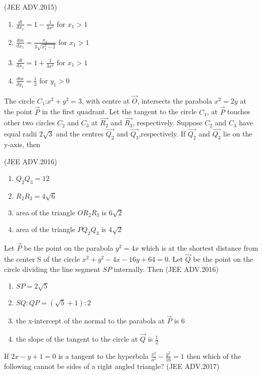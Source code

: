 	      \hfill(JEE ADV.2015)
	      
	       \begin{enumerate}
		      \item $\frac{dl}{dx_1}=1-\frac{1}{3x^2}$ for $x_1>1$ 
		      \item $\frac{dm}{dx_1}=\frac{x_1}{3\sqrt{x_1^2-1}}$ for $x_1>1$ 
		      \item $\frac{dl}{dx_1}=1+\frac{1}{3x^2}$ for $x_1>1$
		      \item $\frac{dm}{dy_1}=\frac{1}{3}$ for $y_1>0$ 
	       \end{enumerate}
      \item The circle $C_1$:$x^2+y^2=3$, with centre at $\vec{O}$, intersects the parabola $x^2=2y$ at the point $\vec{P}$ in the first quadrant. Let the tangent to the circle $C_1$, at $\vec{P}$ touches other two circles $C_2$ and $C_3$ at $\vec{R_2}$ and $\vec{R_3}$, respectively. Suppose $C_2$ and $C_3$ have equal radii $2\sqrt{3}$ and the centres $\vec{Q_2}$ and $\vec{Q_3}$,respectively. If $\vec{Q_2}$ and $\vec{Q_3}$ lie on the y-axis, then 

	      \hfill(JEE ADV.2016)
	      
	       \begin{enumerate}
		      \item $Q_2Q_3=12$
		      \item $R_2R_3=4\sqrt{6}$
		      \item area of the triangle $OR_2R_3$ is $6\sqrt{2}$
		      \item area of the triangle $PQ_2Q_3$ is $4\sqrt{2}$
	       \end{enumerate}
      \item Let $\vec{P}$ be the point on the parabola $y^2=4x$ which is at the shortest distance from the center S of the circle $x^2+y^2-4x-16y+64=0$. Let $\vec{Q}$ be the point on the circle
	      dividing the line segment $SP$ internally. Then 
	      \hfill(JEE ADV.2016)
	      
	       \begin{enumerate}
		      \item $SP=2\sqrt{5}$
		      \item $SQ:QP=(\sqrt{5}+1):2$
		      \item the x-intercept of the normal to the parabola at $\vec{P}$ is $6$
		      \item the slope of the tangent to the circle at $\vec{Q}$ is $\frac{1}{2}$
		      
	       \end{enumerate}
      \item If $2x-y+1=0$ is a tangent to the hyperbola $\frac{x^2}{a^2}-\frac{y^2}{16}=1$ then which of the following cannot be sides of a right angled triangle? 
	      \hfill(JEE ADV.2017)
	      
